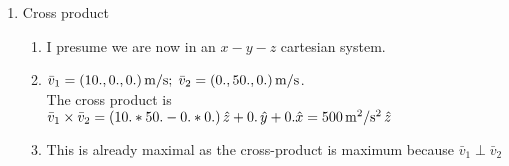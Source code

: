 \documentclass[11pt,letterpaper]{article}
\begin{document}
\begin{enumerate}
\begin{enumerate}
  \item Cross product
  \begin{enumerate}
    \item I presume we are now in an $x-y-z$ cartesian system.
    \item $\bar v_1 = (10., 0., 0.) \, {\rm m/s}; \; \bar v_2 = (0., 50., 0.) \, {\rm m/s}$.  \\
    The cross product is $\bar v_1 \times \bar v_2 = (10.*50. - 0.*0.) \, \hat z + 0. \, \hat y 
    + 0. \hat x = 500 \, {\rm m^2/s^2} \, \hat z$ 
    \item This is already maximal as the cross-product is maximum because $\bar v_1 \perp \bar v_2$
  \end{enumerate}

\end{enumerate}


\end{enumerate}

%
%
%


\end{document}
